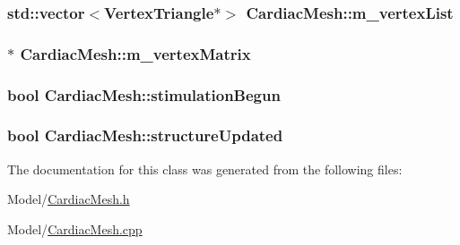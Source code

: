 \hypertarget{class_cardiac_mesh_a1961c25aa2da5493c0316d80c38cc088}{
\subsubsection[{m\+\_\+vertex\+List}]{\setlength{\rightskip}{0pt plus 5cm}std\+::vector$<${\bf Vertex\+Triangle}$\ast$$>$ Cardiac\+Mesh\+::m\+\_\+vertex\+List}}\label{class_cardiac_mesh_a1961c25aa2da5493c0316d80c38cc088}
\hypertarget{class_cardiac_mesh_a0d622a665e0305897c133c8c4fe8733a}{
\subsubsection[{m\+\_\+vertex\+Matrix}]{$\ast$ Cardiac\+Mesh\+::m\+\_\+vertex\+Matrix}}\label{class_cardiac_mesh_a0d622a665e0305897c133c8c4fe8733a}
\hypertarget{class_cardiac_mesh_ac14b1f228c8426e067df4a925824348e}{
\subsubsection[{stimulation\+Begun}]{\setlength{\rightskip}{0pt plus 5cm}bool Cardiac\+Mesh\+::stimulation\+Begun}}\label{class_cardiac_mesh_ac14b1f228c8426e067df4a925824348e}
\hypertarget{class_cardiac_mesh_aa23210cc3b7de35c82ebbcde43e053c2}{
\subsubsection[{structure\+Updated}]{\setlength{\rightskip}{0pt plus 5cm}bool Cardiac\+Mesh\+::structure\+Updated}}\label{class_cardiac_mesh_aa23210cc3b7de35c82ebbcde43e053c2}


The documentation for this class was generated from the following files\+:\begin{DoxyCompactItemize}
\item 
Model/\hyperlink{_cardiac_mesh_8h}{Cardiac\+Mesh.\+h}\item 
Model/\hyperlink{_cardiac_mesh_8cpp}{Cardiac\+Mesh.\+cpp}\end{DoxyCompactItemize}

